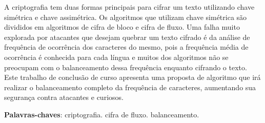 \begin{resumo}
A criptografia tem duas formas principais para cifrar um texto utilizando chave simétrica e chave assimétrica. Os algoritmos que utilizam chave simétrica são divididos em algoritmos de cifra de bloco e cifra de fluxo. Uma falha muito explorada por atacantes que desejam quebrar um texto cifrado é da análise de frequência de ocorrência dos caracteres do mesmo, pois a frequência média de ocorrência é conhecida para cada língua e muitos dos algoritmos não se preocupam com o balanceamento dessa frequência enquanto cifrando o texto. 
Este trabalho de conclusão de curso apresenta uma proposta de algoritmo que irá realizar o balanceamento completo da frequência de caracteres, aumentando sua segurança contra atacantes e curiosos.

 \vspace{\onelineskip}
    
 \noindent
 \textbf{Palavras-chaves}: criptografia. cifra de fluxo. balanceamento.
\end{resumo}
